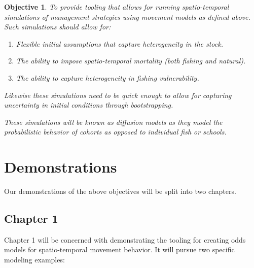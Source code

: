 \documentclass[11pt]{article}
\newtheorem{objective}{Objective}
\begin{document}
\begin{objective}
To provide tooling that allows for running spatio-temporal simulations of management strategies using movement models as defined above. Such simulations should allow for:

\begin{enumerate}
\item Flexible initial assumptions that capture heterogeneity in the stock.
\item The ability to impose spatio-temporal mortality (both fishing and natural).
\item The ability to capture heterogeneity in fishing vulnerability.
\end{enumerate}

Likewise these simulations need to be quick enough to allow for capturing uncertainty in initial conditions through bootstrapping.\newline

These simulations will be known as diffusion models as they model the probabilistic behavior of cohorts as opposed to individual fish or schools. 
\end{objective}



\newpage


















\section{Demonstrations}

Our demonstrations of the above objectives will be split into two chapters. 

\subsection{Chapter 1}

Chapter 1 will be concerned with demonstrating the tooling for creating odds models for spatio-temporal movement behavior. It will pursue two specific modeling examples:
\end{document}
